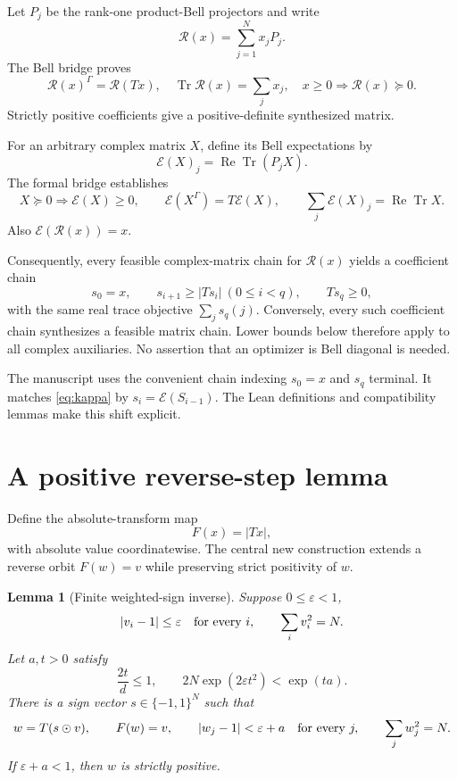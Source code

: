 \documentclass[11pt]{article}
\newtheorem{lemma}{Lemma}
\newcommand{\Tr}{\operatorname{Tr}}
\newcommand{\syn}{\mathcal R}
\begin{document}
Let $P_j$ be the rank-one product-Bell projectors and write
\[
\syn(x)=\sum_{j=1}^N x_jP_j.
\]
The Bell bridge proves
\begin{equation}\label{eq:bridge}
\syn(x)^\Gamma=\syn(Tx),\quad
\Tr\syn(x)=\sum_jx_j,\quad
x\ge0\Longrightarrow\syn(x)\succeq0.
\end{equation}
Strictly positive coefficients give a positive-definite synthesized matrix.

For an arbitrary complex matrix $X$, define its Bell expectations by
\[
\mathcal E(X)_j=\operatorname{Re}\Tr(P_jX).
\]
The formal bridge establishes
\begin{equation}\label{eq:expect}
X\succeq0\Longrightarrow\mathcal E(X)\ge0,\qquad
\mathcal E(X^\Gamma)=T\mathcal E(X),\qquad
\sum_j\mathcal E(X)_j=\operatorname{Re}\Tr X.
\end{equation}
Also $\mathcal E(\syn(x))=x$.

Consequently, every feasible complex-matrix chain for $\syn(x)$ yields a
coefficient chain
\begin{equation}\label{eq:chain}
s_0=x,\qquad s_{i+1}\ge|Ts_i|\ (0\le i<q),\qquad Ts_q\ge0,
\end{equation}
with the same real trace objective $\sum_js_q(j)$. Conversely, every such
coefficient chain synthesizes a feasible matrix chain. Lower bounds below
therefore apply to all complex auxiliaries. No assertion that an optimizer
is Bell diagonal is needed.

The manuscript uses the convenient chain indexing $s_0=x$ and $s_q$ terminal.
It matches \eqref{eq:kappa} by $s_i=\mathcal E(S_{i-1})$. The Lean definitions
and compatibility lemmas make this shift explicit.

\section{A positive reverse-step lemma}\label{sec:inverse}
Define the absolute-transform map
\[
F(x)=|Tx|,
\]
with absolute value coordinatewise. The central new construction extends a
reverse orbit $F(w)=v$ while preserving strict positivity of $w$.

\begin{lemma}[Finite weighted-sign inverse]\label{lem:inverse}
Suppose $0\le\varepsilon<1$,
\[
|v_i-1|\le\varepsilon\quad\hbox{for every }i,
\qquad \sum_i v_i^2=N.
\]
Let $a,t>0$ satisfy
\begin{equation}\label{eq:gates}
\frac{2t}{d}\le1,\qquad
2N\exp(2\varepsilon t^2)<\exp(ta).
\end{equation}
There is a sign vector $s\in\{-1,1\}^N$ such that
\[
w=T(s\odot v),\qquad F(w)=v,\qquad
|w_j-1|<\varepsilon+a\quad\hbox{for every }j,
\qquad \sum_jw_j^2=N.
\]
If $\varepsilon+a<1$, then $w$ is strictly positive.
\end{lemma}
\end{document}
